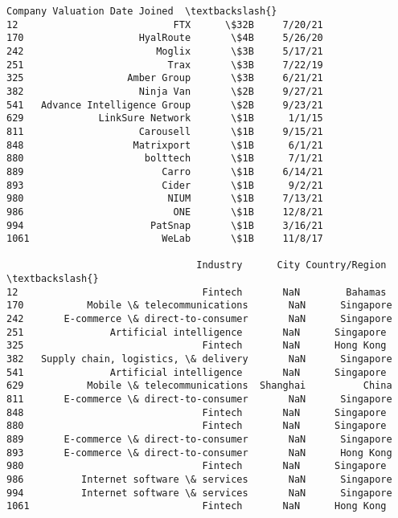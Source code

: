 \documentclass[11pt]{article}
\makeatletter
\newcommand{\boxspacing}{\kern\kvtcb@left@rule\kern\kvtcb@boxsep}
\newcommand{\prompt}[4]{
        \ttfamily\llap{{\color{#2}[#3]:\hspace{3pt}#4}}\vspace{-\baselineskip}
    }
\makeatother
\begin{document}
            \begin{tcolorbox}[breakable, size=fbox, boxrule=.5pt, pad at break*=1mm, opacityfill=0]
\prompt{Out}{outcolor}{13}{\boxspacing}
\begin{Verbatim}[commandchars=\\\{\}]
                         Company Valuation Date Joined  \textbackslash{}
12                           FTX      \$32B     7/20/21
170                    HyalRoute       \$4B     5/26/20
242                       Moglix       \$3B     5/17/21
251                         Trax       \$3B     7/22/19
325                  Amber Group       \$3B     6/21/21
382                    Ninja Van       \$2B     9/27/21
541   Advance Intelligence Group       \$2B     9/23/21
629             LinkSure Network       \$1B      1/1/15
811                    Carousell       \$1B     9/15/21
848                   Matrixport       \$1B      6/1/21
880                     bolttech       \$1B      7/1/21
889                        Carro       \$1B     6/14/21
893                        Cider       \$1B      9/2/21
980                         NIUM       \$1B     7/13/21
986                          ONE       \$1B     12/8/21
994                      PatSnap       \$1B     3/16/21
1061                       WeLab       \$1B     11/8/17

                                 Industry      City Country/Region  \textbackslash{}
12                                Fintech       NaN        Bahamas
170           Mobile \& telecommunications       NaN      Singapore
242       E-commerce \& direct-to-consumer       NaN      Singapore
251               Artificial intelligence       NaN      Singapore
325                               Fintech       NaN      Hong Kong
382   Supply chain, logistics, \& delivery       NaN      Singapore
541               Artificial intelligence       NaN      Singapore
629           Mobile \& telecommunications  Shanghai          China
811       E-commerce \& direct-to-consumer       NaN      Singapore
848                               Fintech       NaN      Singapore
880                               Fintech       NaN      Singapore
889       E-commerce \& direct-to-consumer       NaN      Singapore
893       E-commerce \& direct-to-consumer       NaN      Hong Kong
980                               Fintech       NaN      Singapore
986          Internet software \& services       NaN      Singapore
994          Internet software \& services       NaN      Singapore
1061                              Fintech       NaN      Hong Kong


\end{Verbatim}
\end{tcolorbox}
\end{document}
